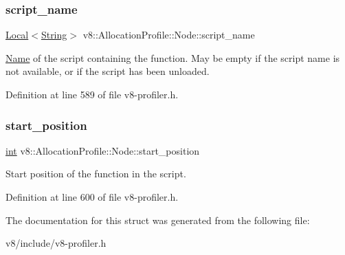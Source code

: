 \subsubsection{\texorpdfstring{script\+\_\+name}{script\_name}}
{\footnotesize\ttfamily \mbox{\hyperlink{classv8_1_1Local}{Local}}$<$\mbox{\hyperlink{classv8_1_1String}{String}}$>$ v8\+::\+Allocation\+Profile\+::\+Node\+::script\+\_\+name}

\mbox{\hyperlink{classv8_1_1Name}{Name}} of the script containing the function. May be empty if the script name is not available, or if the script has been unloaded. 

Definition at line 589 of file v8-\/profiler.\+h.

\mbox{\label{structv8_1_1AllocationProfile_1_1Node_a6caceefbf826a0425adc74331cc7a910}} 
\subsubsection{\texorpdfstring{start\+\_\+position}{start\_position}}
{\footnotesize\ttfamily \mbox{\hyperlink{classint}{int}} v8\+::\+Allocation\+Profile\+::\+Node\+::start\+\_\+position}

Start position of the function in the script. 

Definition at line 600 of file v8-\/profiler.\+h.



The documentation for this struct was generated from the following file\+:\begin{DoxyCompactItemize}
\item 
v8/include/v8-\/profiler.\+h\end{DoxyCompactItemize}
